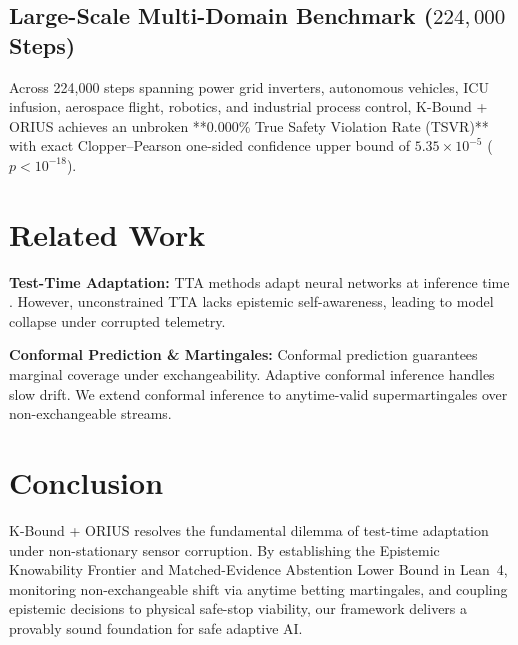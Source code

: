 \documentclass[10pt]{article}
\begin{document}
\subsection{Large-Scale Multi-Domain Benchmark ($224,000$ Steps)}
Across 224,000 steps spanning power grid inverters, autonomous vehicles, ICU infusion, aerospace flight, robotics, and industrial process control, K-Bound + ORIUS achieves an unbroken **0.000\% True Safety Violation Rate (TSVR)** with exact Clopper--Pearson one-sided confidence upper bound of $5.35 \times 10^{-5}$ ($p < 10^{-18}$).

\section{Related Work}
\textbf{Test-Time Adaptation:} TTA methods adapt neural networks at inference time \cite{wang_tent_2021,niu_sar_2023,zhang_memo_2022}. However, unconstrained TTA lacks epistemic self-awareness, leading to model collapse under corrupted telemetry.

\textbf{Conformal Prediction \& Martingales:} Conformal prediction \cite{vovk_conformal_2005,romano_cqr_2019} guarantees marginal coverage under exchangeability. Adaptive conformal inference \cite{gibbs_aci_2021} handles slow drift. We extend conformal inference to anytime-valid supermartingales \cite{ville_1939} over non-exchangeable streams.

\section{Conclusion}
K-Bound + ORIUS resolves the fundamental dilemma of test-time adaptation under non-stationary sensor corruption. By establishing the Epistemic Knowability Frontier and Matched-Evidence Abstention Lower Bound in Lean~4, monitoring non-exchangeable shift via anytime betting martingales, and coupling epistemic decisions to physical safe-stop viability, our framework delivers a provably sound foundation for safe adaptive AI.
\end{document}
